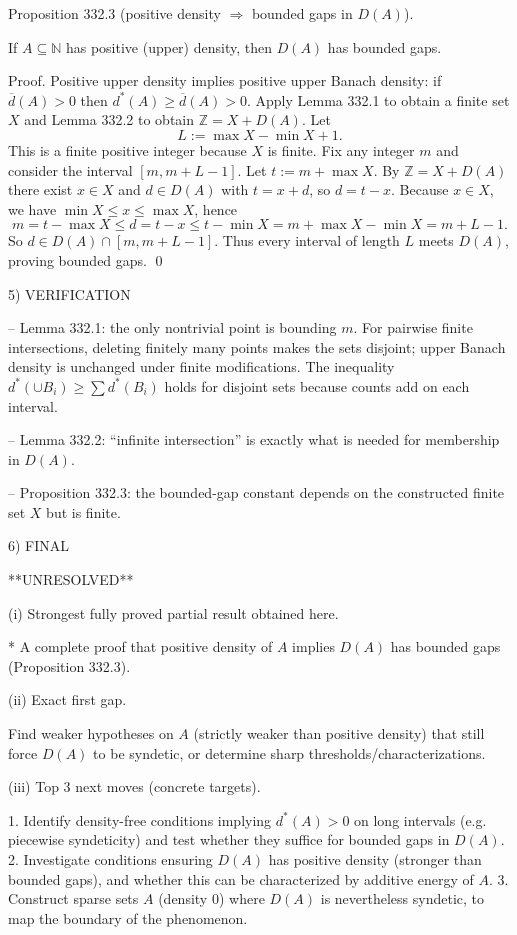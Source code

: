 Proposition 332.3 (positive density $\Rightarrow$ bounded gaps in $D(A)$).

If $A\subseteq\mathbb N$ has positive (upper) density, then $D(A)$ has bounded gaps.

Proof.
Positive upper density implies positive upper Banach density: if $\overline d(A)>0$ then $d^*(A)\ge \overline d(A)>0$.
Apply Lemma 332.1 to obtain a finite set $X$ and Lemma 332.2 to obtain $\mathbb Z=X+D(A)$.
Let
\[
L:=\max X - \min X + 1.
\]
This is a finite positive integer because $X$ is finite.
Fix any integer $m$ and consider the interval $[m,m+L-1]$.
Let $t:=m+\max X$.
By $\mathbb Z=X+D(A)$ there exist $x\in X$ and $d\in D(A)$ with $t=x+d$, so $d=t-x$.
Because $x\in X$, we have $\min X\le x\le \max X$, hence
\[
m = t-\max X \le d = t-x \le t-\min X = m+\max X-\min X = m+L-1.
\]
So $d\in D(A)\cap[m,m+L-1]$.
Thus every interval of length $L$ meets $D(A)$, proving bounded gaps. \qed


5) VERIFICATION

-- Lemma 332.1: the only nontrivial point is bounding $m$. For pairwise finite intersections, deleting finitely many points makes the sets disjoint; upper Banach density is unchanged under finite modifications.
The inequality $d^*(\cup B_i)\ge\sum d^*(B_i)$ holds for disjoint sets because counts add on each interval.

-- Lemma 332.2: ``infinite intersection'' is exactly what is needed for membership in $D(A)$.

-- Proposition 332.3: the bounded-gap constant depends on the constructed finite set $X$ but is finite.


6) FINAL

**UNRESOLVED**

(i) Strongest fully proved partial result obtained here.

* A complete proof that positive density of $A$ implies $D(A)$ has bounded gaps (Proposition 332.3).

(ii) Exact first gap.

Find weaker hypotheses on $A$ (strictly weaker than positive density) that still force $D(A)$ to be syndetic, or determine sharp thresholds/characterizations.

(iii) Top 3 next moves (concrete targets).

1. Identify density-free conditions implying $d^*(A)>0$ on long intervals (e.g. piecewise syndeticity) and test whether they suffice for bounded gaps in $D(A)$.
2. Investigate conditions ensuring $D(A)$ has positive density (stronger than bounded gaps), and whether this can be characterized by additive energy of $A$.
3. Construct sparse sets $A$ (density $0$) where $D(A)$ is nevertheless syndetic, to map the boundary of the phenomenon.

